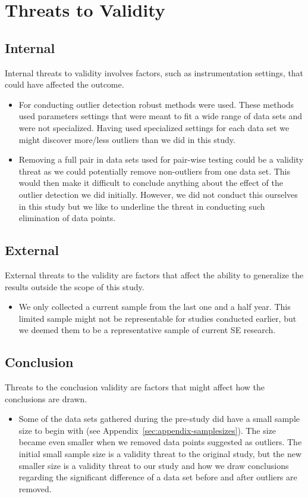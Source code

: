 ﻿\section{Threats to Validity}
\label{sec:threatstovalidity}


\subsection{Internal}
Internal threats to validity involves factors, such as instrumentation settings, that could have affected the outcome.
\begin{itemize}
        \item For conducting outlier detection robust methods were used. These methods used parameters settings that were meant to fit a wide range of data sets and were not specialized. Having used specialized settings for each data set we might discover more\slash less outliers than we did in this study.


        \item Removing a full pair in data sets used for pair-wise testing could be a validity threat as we could potentially remove non-outliers from one data set. This would then make it difficult to conclude anything about the effect of the outlier detection we did initially. However, we did not conduct this ourselves in this study but we like to underline the threat in conducting such elimination of data points.
\end{itemize}


\subsection{External}
External threats to the validity are factors that affect the ability to generalize the results outside the scope of this study.
\begin{itemize}
\item We only collected a current sample from the last one and a half year. This limited sample might not be representable for studies conducted earlier, but we deemed them to be a representative sample of current SE research.
\end{itemize}


\subsection{Conclusion}
Threats to the conclusion validity are factors that might affect how the conclusions are drawn.
\begin{itemize}
\item Some of the data sets gathered during the pre-study did have a small sample size to begin with (see Appendix~\ref{sec:appendix-samplesizes}). The size became even smaller when we removed data points suggested as outliers. The initial small sample size is a validity threat to the original study, but the new smaller size is a validity threat to our study and how we draw conclusions regarding the significant difference of a data set before and after outliers are removed.
\end{itemize}


